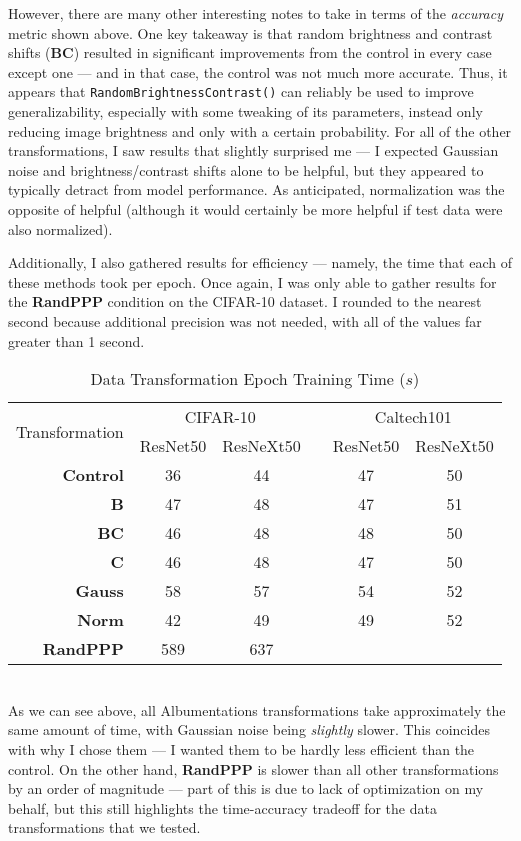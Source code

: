 \documentclass{article}
\begin{document}
However, there are many other interesting notes to take in terms of the \textit{accuracy} metric shown above. One key takeaway is that random brightness and contrast shifts (\textbf{BC}) resulted in significant improvements from the control in every case except one --- and in that case, the control was not much more accurate. Thus, it appears that \texttt{RandomBrightnessContrast()} can reliably be used to improve generalizability, especially with some tweaking of its parameters, instead only reducing image brightness and only with a certain probability. For all of the other transformations, I saw results that slightly surprised me --- I expected Gaussian noise and brightness/contrast shifts alone to be helpful, but they appeared to typically detract from model performance. As anticipated, normalization was the opposite of helpful (although it would certainly be more helpful if test data were also normalized). 


Additionally, I also gathered results for efficiency --- namely, the time that each of these methods took per epoch. Once again, I was only able to gather results for the \textbf{RandPPP} condition on the CIFAR-10 dataset. I rounded to the nearest second because additional precision was not needed, with all of the values far greater than 1 second.
\begin{table}[h] \centering
\caption{Data Transformation Epoch Training Time ($s$)}
\begin{tabular}{@{}r|ccccc@{}}\toprule
\multirow{2}{*}{Transformation} & \multicolumn{2}{c}{CIFAR-10} & \phantom{abc}& \multicolumn{2}{c}{Caltech101} \\
\cmidrule{2-3} \cmidrule{5-6}
& ResNet50 & ResNeXt50 && ResNet50 & ResNeXt50\\ \midrule
\textbf{Control} & 36 & 44 && 47 & 50 \\
\textbf{B} & 47 & 48 && 47 & 51 \\
\textbf{BC}& 46 & 48 && 48 & 50 \\
\textbf{C}& 46 & 48 && 47 & 50 \\
\textbf{Gauss}& 58 & 57 && 54 & 52 \\
\textbf{Norm}& 42 & 49 && 49 & 52 \\
\textbf{RandPPP}& 589 & 637 &&  &  \\
\bottomrule
\end{tabular}
\end{table}
\\ As we can see above, all Albumentations transformations take approximately the same amount of time, with Gaussian noise being \textit{slightly} slower. This coincides with why I chose them --- I wanted them to be hardly less efficient than the control. On the other hand, \textbf{RandPPP} is slower than all other transformations by an order of magnitude --- part of this is due to lack of optimization on my behalf, but this still highlights the time-accuracy tradeoff for the data transformations that we tested.
\end{document}
